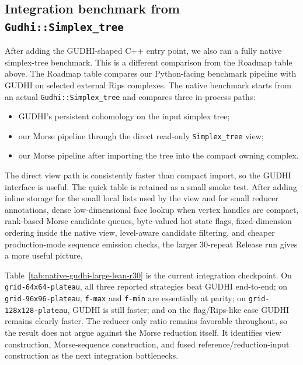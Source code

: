 \documentclass[11pt]{article}
\begin{document}
\subsection{Integration benchmark from \texorpdfstring{\texttt{Gudhi::Simplex\_tree}}{Gudhi::Simplex\_tree}}

After adding the GUDHI-shaped C++ entry point, we also ran a fully native simplex-tree
benchmark.  This is a different comparison from the Roadmap table above.  The Roadmap
table compares our Python-facing benchmark pipeline with GUDHI on selected external Rips
complexes.  The native benchmark starts from an actual \texttt{Gudhi::Simplex\_tree} and
compares three in-process paths:
\begin{itemize}
  \item GUDHI's persistent cohomology on the input simplex tree;
  \item our Morse pipeline through the direct read-only \texttt{Simplex\_tree} view;
  \item our Morse pipeline after importing the tree into the compact owning complex.
\end{itemize}



The direct view path is consistently faster than compact import, so the GUDHI interface is
useful.  The quick table is retained as a small smoke test.  After adding inline storage
for the small local lists used by the view and for small reducer annotations, dense
low-dimensional face lookup when vertex handles are compact, rank-based Morse candidate
queues, byte-valued hot state flags, fixed-dimension ordering inside the native view,
level-aware candidate filtering, and cheaper production-mode sequence emission checks, the
larger 30-repeat Release run gives a more useful picture.



Table~\ref{tab:native-gudhi-large-lean-r30} is the current integration checkpoint.  On
\texttt{grid-64x64-plateau}, all three reported strategies beat GUDHI end-to-end; on
\texttt{grid-96x96-plateau}, \texttt{f-max} and \texttt{f-min} are essentially at parity;
on \texttt{grid-128x128-plateau}, GUDHI is still faster; and on the flag/Rips-like case
GUDHI remains clearly faster.  The reducer-only ratio remains favorable throughout, so the
result does not argue against the Morse reduction itself.  It identifies view
construction, Morse-sequence construction, and fused reference/reduction-input
construction as the next integration bottlenecks.
\end{document}
